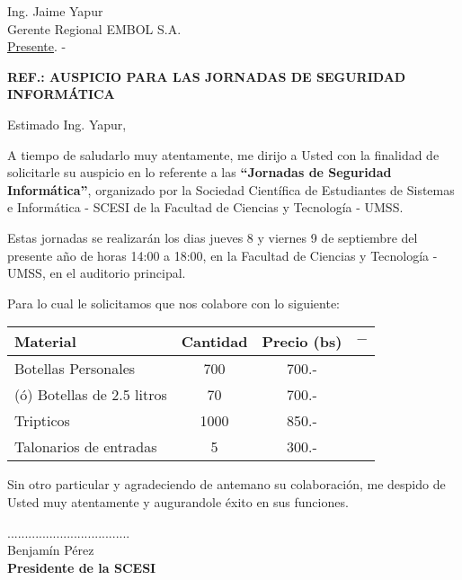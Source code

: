 \documentclass[letterpaper,12pt]{letter}
\begin{document}
\date {27 de agosto de 2011}

\begin{letter}{Ing. Jaime Yapur \\ Gerente Regional EMBOL S.A. \\ \underline {Presente}. -}

\begin{center}
	\opening{\textbf{REF.: AUSPICIO PARA LAS JORNADAS DE SEGURIDAD INFORM\'ATICA}}
\end{center}

Estimado Ing. Yapur,

A tiempo de saludarlo muy atentamente, me dirijo a Usted con la finalidad de solicitarle su auspicio en lo referente 
a las {\bfseries ``Jornadas de Seguridad Inform\'atica''}, organizado por la Sociedad Cient\'ifica de Estudiantes de 
Sistemas e Inform\'atica - SCESI de la Facultad de Ciencias y Tecnolog\'ia - UMSS.

Estas jornadas se realizar\'an los dias jueves 8 y viernes 9 de septiembre del presente a\~no de horas 14:00 a 
18:00, en la Facultad de Ciencias y Tecnolog\'ia - UMSS, en el auditorio principal.

Para lo cual le solicitamos que nos colabore con lo siguiente:

\begin{tabular}{|l|c|c|c|}
\hline
{\bfseries Material} & {\bfseries Cantidad} & {\bfseries Precio (bs)} & $-$ \\
\hline
Botellas Personales & 700 & 700.-  & \\
\hline
(\'o) Botellas de 2.5 litros & 70 & 700.-  & \\
\hline
Tripticos & 1000 & 850.- & \\
\hline
Talonarios de entradas & 5 & 300.- & \\
\hline
\end{tabular}

Sin otro particular y agradeciendo de antemano su colaboraci\'on, me despido de Usted muy atentamente y augurandole \'exito en sus funciones.\\

\vspace{2cm}

\begin{center}
...................................\\
Benjam\'in P\'erez\\
{\bfseries Presidente de la  SCESI}
\end{center}

\end{letter}
\end{document}
